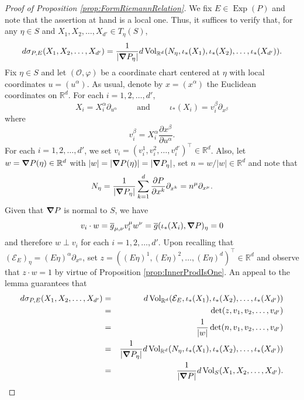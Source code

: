 \documentclass[11pt]{article}
\newcommand\Exp{\operatorname{Exp}}
\renewcommand\det{\operatorname{det}}
\newcommand{\Vol}{\operatorname{Vol}}
\begin{document}
\begin{proof}[Proof of Proposition \ref{prop:FormRiemannRelation}]
We fix $E\in\Exp(P)$ and note that the assertion at hand is a local one. Thus, it suffices to verify that, for any $\eta\in S$ and $X_1,X_2,\dots,X_{d'}\in T_\eta(S)$, 
\begin{equation*}
    d\sigma_{P,E}(X_1,X_2,\dots,X_{d'})=\frac{1}{|\grad P_{\eta}|}d\Vol_{\mathbb{R}^d}(N_\eta,\iota_*(X_1),\iota_*(X_2),\dots,\iota_*(X_{d'})).
\end{equation*}
Fix $\eta\in S$ and let $(\mathcal{O},\varphi)$ be a coordinate chart centered at $\eta$ with local coordinates $u=(u^{\alpha})$. As usual, denote by $x=(x^{\alpha})$ the Euclidean coordinates on $\mathbb{R}^d$.  For each $i=1,2,\dots,{d'}$, \begin{equation*}
X_i=X_i^\alpha \partial_{u^{\alpha}}\hspace{1cm}\mbox{and}\hspace{1cm}\iota_*(X_i)=v_i^\beta\partial_{x^{\beta}}
\end{equation*}
where
\begin{equation*}
v_i^\beta =X_i^\alpha\frac{\partial x^\beta}{\partial u^\alpha}.
\end{equation*}
For each $i=1,2,\dots,d'$, we set $v_i=(v_i^1,v_i^2,\dots,v_i^{d'})^\top\in\mathbb{R}^d$. Also, let $w=\grad P(\eta)\in\mathbb{R}^d$ with $|w|=|\grad P(\eta)|=|\grad P_\eta|$, set $n=w/|w|\in\mathbb{R}^d$ and note that
\begin{equation*}
    N_\eta=\frac{1}{|\grad P_\eta|}\sum_{k=1}^d\frac{\partial P}{\partial x^{k}}\partial_{x^k}=n^{\mu}\partial_{x^\mu}.
\end{equation*}Given that $\grad P$ is normal to $S$, we have
\begin{equation*}
    v_i\cdot w=\overline{g}_{\mu,\nu}v_i^\mu w^\nu= \overline{g}(\iota_*(X_i),\grad P)_\eta=0
\end{equation*}
and therefore $w\perp v_i$ for each $i=1,2,\dots,{d'}$. Upon recalling that $(\mathcal{E}_E)_\eta=(E\eta)^\alpha\partial_{x^{\alpha}}$, set $z=((E\eta)^1,(E\eta)^2,\dots,(E\eta)^d)^\top\in\mathbb{R}^d$ and observe that $z\cdot w=1$ by virtue of Proposition \ref{prop:InnerProdIsOne}. An appeal to the lemma guarantees that
\begin{eqnarray*}
d\sigma_{P,E}(X_1,X_2,\dots,X_{d'})&=&d\Vol_{\mathbb{R}^d}(\mathcal{E}_E,\iota_*(X_1),\iota_*(X_2),\dots,\iota_*(X_{d'}))\\
&=&\det(z,v_1,v_2,\dots,v_{d'})\\
&=&\frac{1}{|w|}\det(n,v_1,v_2,\dots,v_{d'})\\
&=&\frac{1}{|\grad P_\eta|}d\Vol_{\mathbb{R}^d}(N_\eta,\iota_*(X_1),\iota_*(X_2),\dots,\iota_*(X_{d'}))\\
&=&\frac{1}{|\grad P|}d\Vol_S(X_1,X_2,\dots,X_{d'}).
\end{eqnarray*}
\end{proof}
\end{document}
